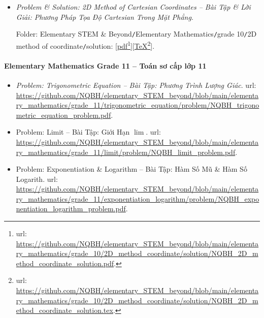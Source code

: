 \documentclass[12pt]{article}
\begin{document}
\begin{itemize}
	Folder: {\sf Elementary STEM \& Beyond{\tt/}Elementary Mathematics{\tt/}grade 10{\tt/}2D method of coordinate{\tt/}problem}: [\href{https://github.com/NQBH/elementary_STEM_beyond/blob/main/elementary_mathematics/grade_10/2D_method_coordinate/problem/NQBH_2D_method_coordinate_problem.pdf}{pdf}\footnote{{\sc url}: \url{https://github.com/NQBH/elementary_STEM_beyond/blob/main/elementary_mathematics/grade_10/2D_method_coordinate/problem/NQBH_2D_method_coordinate_problem.pdf}.}][\href{https://github.com/NQBH/elementary_STEM_beyond/blob/main/elementary_mathematics/grade_10/2D_method_coordinate/problem/NQBH_2D_method_coordinate_problem.tex}{\TeX}\footnote{{\sc url}: \url{https://github.com/NQBH/elementary_STEM_beyond/blob/main/elementary_mathematics/grade_10/2D_method_coordinate/problem/NQBH_2D_method_coordinate_problem.tex}.}].
	\item {\it Problem \& Solution: 2D Method of Cartesian Coordinates -- Bài Tập \& Lời Giải: Phương Pháp Tọa Độ Cartesian Trong Mặt Phẳng}.
	
	Folder: {\sf Elementary STEM \& Beyond{\tt/}Elementary Mathematics{\tt/}grade 10{\tt/}2D method of coordinate{\tt/}solution}: [\href{https://github.com/NQBH/elementary_STEM_beyond/blob/main/elementary_mathematics/grade_10/2D_method_coordinate/solution/NQBH_2D_method_coordinate_solution.pdf}{pdf}\footnote{{\sc url}: \url{https://github.com/NQBH/elementary_STEM_beyond/blob/main/elementary_mathematics/grade_10/2D_method_coordinate/solution/NQBH_2D_method_coordinate_solution.pdf}.}][\href{https://github.com/NQBH/elementary_STEM_beyond/blob/main/elementary_mathematics/grade_10/2D_method_coordinate/solution/NQBH_2D_method_coordinate_solution.tex}{\TeX}\footnote{{\sc url}: \url{https://github.com/NQBH/elementary_STEM_beyond/blob/main/elementary_mathematics/grade_10/2D_method_coordinate/solution/NQBH_2D_method_coordinate_solution.tex}.}].
\end{itemize}

\paragraph{Elementary Mathematics Grade 11 -- Toán sơ cấp lớp 11}

\begin{itemize}
	\item {\it Problem: Trigonometric Equation -- Bài Tập: Phương Trình Lượng Giác}. {\sc url}: \url{https://github.com/NQBH/elementary_STEM_beyond/blob/main/elementary_mathematics/grade_11/trigonometric_equation/problem/NQBH_trigonometric_equation_problem.pdf}.	
	\item Problem: Limit -- Bài Tập: Giới Hạn $\lim$. {\sc url}: \url{https://github.com/NQBH/elementary_STEM_beyond/blob/main/elementary_mathematics/grade_11/limit/problem/NQBH_limit_problem.pdf}.
	\item Problem: Exponentiation \& Logarithm -- Bài Tập: Hàm Số Mũ \& Hàm Số Logarith. {\sc url}: \url{https://github.com/NQBH/elementary_STEM_beyond/blob/main/elementary_mathematics/grade_11/exponentiation_logarithm/problem/NQBH_exponentiation_logarithm_problem.pdf}.
\end{itemize}
\end{document}

